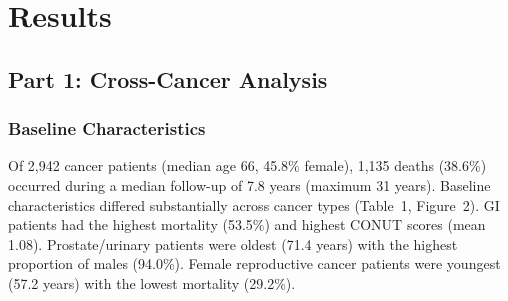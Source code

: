 \documentclass[review]{elsarticle}
\begin{document}
\section{Results}

\subsection{Part 1: Cross-Cancer Analysis}

\subsubsection{Baseline Characteristics}

Of 2,942 cancer patients (median age 66, 45.8\% female), 1,135 deaths (38.6\%) occurred during a median follow-up of 7.8 years (maximum 31 years). Baseline characteristics differed substantially across cancer types (Table~1, Figure~2). GI patients had the highest mortality (53.5\%) and highest CONUT scores (mean 1.08). Prostate/urinary patients were oldest (71.4 years) with the highest proportion of males (94.0\%). Female reproductive cancer patients were youngest (57.2 years) with the lowest mortality (29.2\%).

\begin{table}[t]
\caption{Baseline Characteristics by Cancer Type}
\label{tab:pan_baseline}
\centering{}
\end{table}
\end{document}

